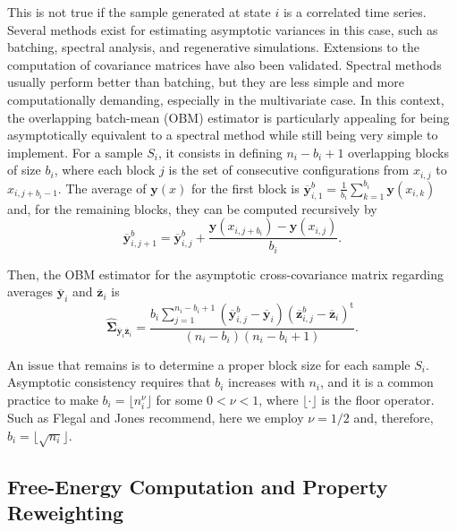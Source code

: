 \documentclass[aip,jcp,reprint,amsmath,amssymb]{revtex4-1}
\newcommand{\mt}[1]{\boldsymbol{\mathbf{#1}}}           %
\newcommand{\vt}[1]{\boldsymbol{\mathbf{#1}}}           %
\newcommand{\tr}[1]{#1^\text{t}}                        %
\begin{document}
This is not true if the sample generated at state $i$ is a correlated time series. Several methods exist for estimating asymptotic variances in this case, such as batching, spectral analysis, and regenerative simulations.\cite{Geyer_1992, Alexopoulos_2006, Flegal_2010, Doss_2014} Extensions to the computation of covariance matrices have also been validated.\cite{Vats_2015, Vats_2017} Spectral methods usually perform better than batching,\cite{Flegal_2010} but they are less simple and more computationally demanding, especially in the multivariate case.\cite{Vats_2015} In this context, the overlapping batch-mean (OBM) estimator\cite{Meketon_1984} is particularly appealing for being asymptotically equivalent to a spectral method while still being very simple to implement. For a sample $S_i$, it consists in defining $n_i-b_i+1$ overlapping blocks of size $b_i$, where each block $j$ is the set of consecutive configurations from $x_{i,j}$ to $x_{i,j+b_i-1}$. The average of $\vt y(x)$ for the first block is ${\overline{\vt y}}^b_{i,1} = \frac{1}{b_i} \sum_{k=1}^{b_i} \vt y(x_{i,k})$ and, for the remaining blocks, they can be computed recursively by
\begin{equation*}
{\overline{\vt y}}^b_{i,j+1} = {\overline{\vt y}}^b_{i,j} + \frac{\vt y(x_{i,j+b_i}) - \vt y(x_{i,j})}{b_i}.
\end{equation*}

Then, the OBM estimator for the asymptotic cross-covariance matrix regarding averages $\overline{\vt y}_i$ and $\overline{\vt z}_i$ is\cite{Meketon_1984}
\begin{equation}
\label{eq:obm asymptotic covariance}
\hat{\mt \Sigma}_{\overline{\vt y}_i\overline{\vt z}_i} = \frac{b_i \sum\limits_{j=1}^{n_i - b_i + 1} ({\overline{\vt y}}^b_{i,j} - \overline{\vt y}_i) \tr{({\overline{\vt z}}^b_{i,j} - \overline{\vt z}_i)}}{(n_i - b_i)(n_i - b_i + 1)}.
\end{equation}

An issue that remains is to determine a proper block size for each sample $S_i$. Asymptotic consistency requires that $b_i$ increases with $n_i$, and it is a common practice to make $b_i = \lfloor n_i^\nu \rfloor$ for some $0 < \nu < 1$, where $\lfloor \cdot \rfloor$ is the floor operator. Such as Flegal and Jones\cite{Flegal_2010} recommend, here we employ $\nu = 1/2$ and, therefore, $b_i = \lfloor \sqrt{n_i} \rfloor$.

\subsection{Free-Energy Computation and Property Reweighting}
\end{document}
